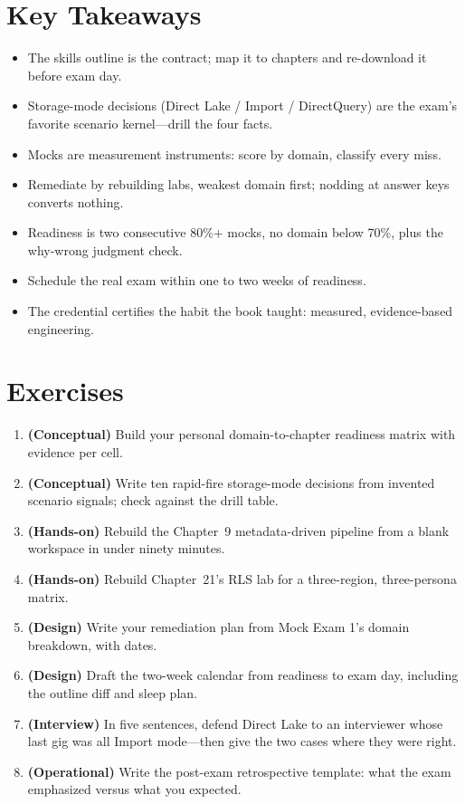 \section*{Key Takeaways}
\begin{itemize}
    \item The skills outline is the contract; map it to chapters and re-download it before exam day.
    \item Storage-mode decisions (Direct Lake / Import / DirectQuery) are the exam's favorite scenario kernel---drill the four facts.
    \item Mocks are measurement instruments: score by domain, classify every miss.
    \item Remediate by rebuilding labs, weakest domain first; nodding at answer keys converts nothing.
    \item Readiness is two consecutive 80\%+ mocks, no domain below 70\%, plus the why-wrong judgment check.
    \item Schedule the real exam within one to two weeks of readiness.
    \item The credential certifies the habit the book taught: measured, evidence-based engineering.
\end{itemize}

\section{Exercises}
\begin{enumerate}
    \item \textbf{(Conceptual)} Build your personal domain-to-chapter readiness matrix with evidence per cell.
    \item \textbf{(Conceptual)} Write ten rapid-fire storage-mode decisions from invented scenario signals; check against the drill table.
    \item \textbf{(Hands-on)} Rebuild the Chapter~9 metadata-driven pipeline from a blank workspace in under ninety minutes.
    \item \textbf{(Hands-on)} Rebuild Chapter~21's RLS lab for a three-region, three-persona matrix.
    \item \textbf{(Design)} Write your remediation plan from Mock Exam 1's domain breakdown, with dates.
    \item \textbf{(Design)} Draft the two-week calendar from readiness to exam day, including the outline diff and sleep plan.
    \item \textbf{(Interview)} In five sentences, defend Direct Lake to an interviewer whose last gig was all Import mode---then give the two cases where they were right.
    \item \textbf{(Operational)} Write the post-exam retrospective template: what the exam emphasized versus what you expected.
\end{enumerate}

